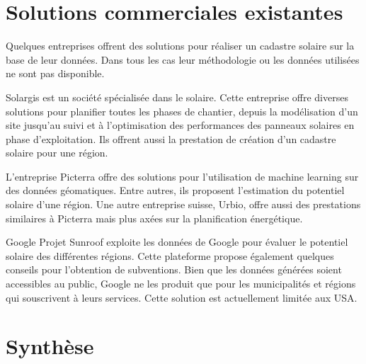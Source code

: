 {{{{\section{Solutions commerciales existantes}
\par{Quelques entreprises offrent des solutions pour réaliser un cadastre solaire sur la base de leur données. Dans tous les cas leur méthodologie ou les données utilisées ne sont pas disponible.}
\par{Solargis \cite{solargis_regional_nodate} est un société spécialisée dans le solaire. Cette entreprise offre diverses solutions pour planifier toutes les phases de chantier, depuis la modélisation d'un site jusqu'au suivi et à l'optimisation des performances des panneaux solaires en phase d'exploitation. Ils offrent aussi la prestation de création d'un cadastre solaire pour une région.}
\par{L'entreprise Picterra \cite{picterra_infrastructure_nodate} offre des solutions pour l'utilisation de machine learning sur des données géomatiques. Entre autres, ils proposent l'estimation du potentiel solaire d'une région. Une autre entreprise suisse, Urbio, \cite{urbio_urbio_nodate} offre aussi des prestations similaires à Picterra mais plus axées sur la planification énergétique.}
\par{Google Projet Sunroof \cite{google_project_nodate} exploite les données de Google pour évaluer le potentiel solaire des différentes régions. Cette plateforme propose également quelques conseils pour l'obtention de subventions. Bien que les données générées soient accessibles au public, Google ne les produit que pour les municipalités et régions qui souscrivent à leurs services. Cette solution est actuellement limitée aux USA.}

\section{Synthèse}































}}}}
